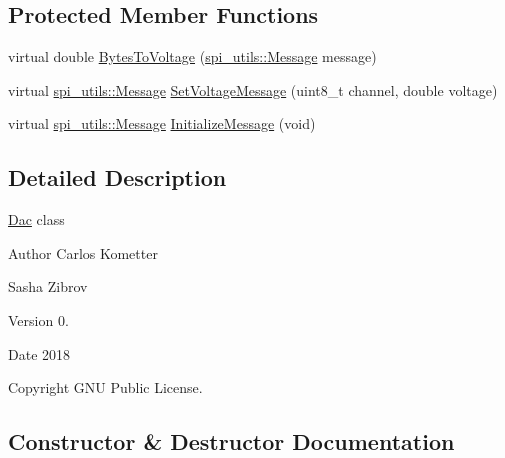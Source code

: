 \subsection*{Protected Member Functions}
\begin{DoxyCompactItemize}
\item 
virtual double \mbox{\hyperlink{classDac_a2dc7bd90fddf1e38af8f18a0191ce840}{Bytes\+To\+Voltage}} (\mbox{\hyperlink{structspi__utils_1_1Message}{spi\+\_\+utils\+::\+Message}} message)
\item 
virtual \mbox{\hyperlink{structspi__utils_1_1Message}{spi\+\_\+utils\+::\+Message}} \mbox{\hyperlink{classDac_a35805ada711f0803a2efba938a9f8b28}{Set\+Voltage\+Message}} (uint8\+\_\+t channel, double voltage)
\item 
virtual \mbox{\hyperlink{structspi__utils_1_1Message}{spi\+\_\+utils\+::\+Message}} \mbox{\hyperlink{classDac_a03364933179f8c104a5be6581bde0246}{Initialize\+Message}} (void)
\end{DoxyCompactItemize}


\subsection{Detailed Description}
\mbox{\hyperlink{classDac}{Dac}} class \begin{DoxyAuthor}{Author}
Carlos Kometter 

Sasha Zibrov 
\end{DoxyAuthor}
\begin{DoxyVersion}{Version}
0. 
\end{DoxyVersion}
\begin{DoxyDate}{Date}
2018 
\end{DoxyDate}
\begin{DoxyCopyright}{Copyright}
G\+NU Public License. 
\end{DoxyCopyright}


\subsection{Constructor \& Destructor Documentation}
\mbox{\label{classDac_a43b0ea171bf0dfad95427e9751b6e191}} 

